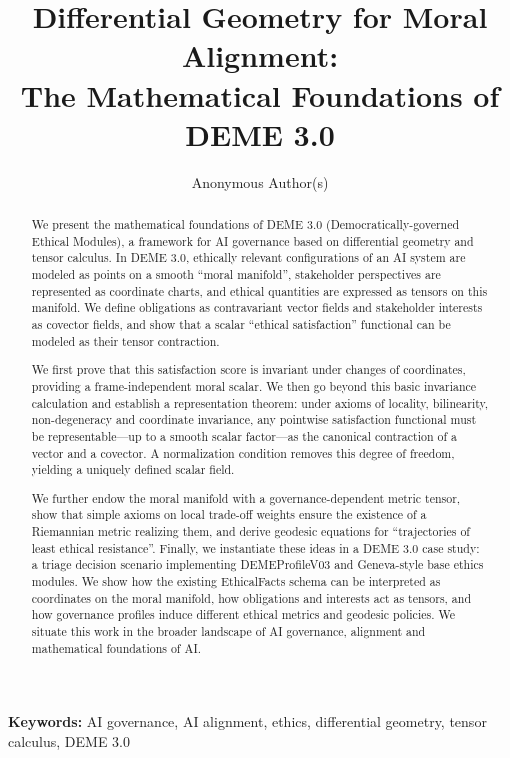 \documentclass[12pt]{article}
\title{Differential Geometry for Moral Alignment:\\The Mathematical Foundations of DEME 3.0}
\author{Anonymous Author(s)}
\date{}
\theoremstyle{remark}
\begin{document}
\maketitle

\noindent\textbf{Keywords:} AI governance, AI alignment, ethics, differential geometry, tensor calculus, DEME 3.0

\begin{abstract}
We present the mathematical foundations of DEME 3.0 (Democratically-governed Ethical Modules), a framework for AI governance based on differential geometry and tensor calculus. In DEME 3.0, ethically relevant configurations of an AI system are modeled as points on a smooth ``moral manifold'', stakeholder perspectives are represented as coordinate charts, and ethical quantities are expressed as tensors on this manifold. We define obligations as contravariant vector fields and stakeholder interests as covector fields, and show that a scalar ``ethical satisfaction'' functional can be modeled as their tensor contraction.

We first prove that this satisfaction score is invariant under changes of coordinates, providing a frame-independent moral scalar. We then go beyond this basic invariance calculation and establish a representation theorem: under axioms of locality, bilinearity, non-degeneracy and coordinate invariance, any pointwise satisfaction functional must be representable---up to a smooth scalar factor---as the canonical contraction of a vector and a covector. A normalization condition removes this degree of freedom, yielding a uniquely defined scalar field.

We further endow the moral manifold with a governance-dependent metric tensor, show that simple axioms on local trade-off weights ensure the existence of a Riemannian metric realizing them, and derive geodesic equations for ``trajectories of least ethical resistance''. Finally, we instantiate these ideas in a DEME 3.0 case study: a triage decision scenario implementing DEMEProfileV03 and Geneva-style base ethics modules. We show how the existing EthicalFacts schema can be interpreted as coordinates on the moral manifold, how obligations and interests act as tensors, and how governance profiles induce different ethical metrics and geodesic policies. We situate this work in the broader landscape of AI governance, alignment and mathematical foundations of AI.
\end{abstract}

\end{document}
